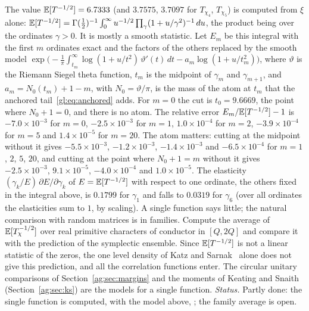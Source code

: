 \begin{problem}\label{gl:op:negmoment}
The value $\mathbb{E}[T^{-1/2}]=6.7333$ (and $3.7575$, $3.7097$ for $T_{\chi_4}$, $T_{\chi_5}$) is computed from $\xi$ alone: $\mathbb{E}[T^{-1/2}]=\Gamma(\tfrac12)^{-1}\int_0^\infty u^{-1/2}\prod_\gamma(1+u/\gamma^2)^{-1}\,du$, the product being over the ordinates $\gamma>0$. It is mostly a smooth statistic. Let $E_m$ be this integral with the first $m$ ordinates exact and the factors of the others replaced by the smooth model $\exp\big(-\tfrac1\pi\int_{t_m}^\infty\log(1+u/t^2)\,\vartheta'(t)\,dt-a_m\log(1+u/t_m^2)\big)$, where $\vartheta$ is the Riemann Siegel theta function, $t_m$ is the midpoint of $\gamma_m$ and $\gamma_{m+1}$, and $a_m=N_0(t_m)+1-m$, with $N_0=\vartheta/\pi$, is the mass of the atom at $t_m$ that the anchored tail~\eqref{gl:eq:anchored} adds. For $m=0$ the cut is $t_0=9.6669$, the point where $N_0+1=0$, and there is no atom. The relative error $E_m/\mathbb{E}[T^{-1/2}]-1$ is $-7.0\times10^{-3}$ for $m=0$, $-2.5\times10^{-3}$ for $m=1$, $1.0\times10^{-4}$ for $m=2$, $-3.9\times10^{-4}$ for $m=5$ and $1.4\times10^{-5}$ for $m=20$. The atom matters: cutting at the midpoint without it gives $-5.5\times10^{-3}$, $-1.2\times10^{-3}$, $-1.4\times10^{-3}$ and $-6.5\times10^{-4}$ for $m=1$, $2$, $5$, $20$, and cutting at the point where $N_0+1=m$ without it gives $-2.5\times10^{-3}$, $9.1\times10^{-5}$, $-4.0\times10^{-4}$ and $1.0\times10^{-5}$. The elasticity $(\gamma_k/E)\,\partial E/\partial\gamma_k$ of $E=\mathbb{E}[T^{-1/2}]$ with respect to one ordinate, the others fixed in the integral above, is $0.1799$ for $\gamma_1$ and falls to $0.0319$ for $\gamma_6$ (over all ordinates the elasticities sum to $1$, by scaling). A single function says little; the natural comparison with random matrices is in families. Compute the average of $\mathbb{E}[T_\chi^{-1/2}]$ over real primitive characters of conductor in $[Q,2Q]$ and compare it with the prediction of the symplectic ensemble. Since $\mathbb{E}[T^{-1/2}]$ is not a linear statistic of the zeros, the one level density of Katz and Sarnak~\cite{KatzSarnak99} alone does not give this prediction, and all the correlation functions enter. The circular unitary comparisons of Section~\ref{ag:sec:margins} and the moments of Keating and Snaith~\cite{KS00} (Section~\ref{ag:sec:ks}) are the models for a single function. \emph{Status.} Partly done: the single function is computed, with the model above, ; the family average is open.
\end{problem}

